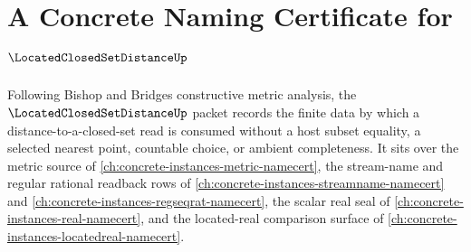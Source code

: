\chapter{A Concrete Naming Certificate for $\LocatedClosedSetDistanceUp$}
\label{ch:concrete-instances-located-closed-set-distance-namecert}

Following Bishop and Bridges constructive metric analysis, the $\LocatedClosedSetDistanceUp$ packet records the finite data by which a distance-to-a-closed-set read is consumed without a host subset equality, a selected nearest point, countable choice, or ambient completeness. It sits over the metric source of \autoref{ch:concrete-instances-metric-namecert}, the stream-name and regular rational readback rows of \autoref{ch:concrete-instances-streamname-namecert} and \autoref{ch:concrete-instances-regseqrat-namecert}, the scalar real seal of \autoref{ch:concrete-instances-real-namecert}, and the located-real comparison surface of \autoref{ch:concrete-instances-locatedreal-namecert}.


